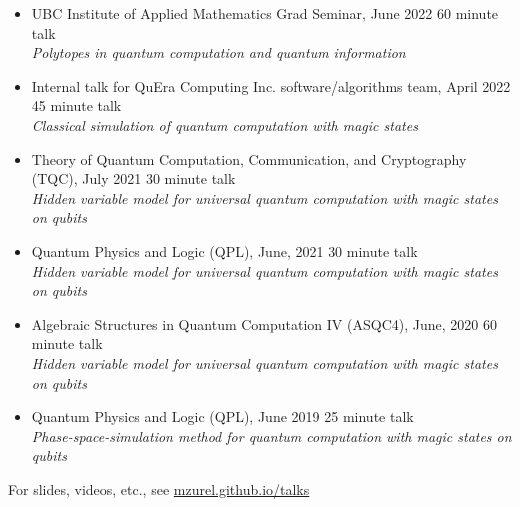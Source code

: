 \documentclass[letterpaper,11pt]{article}
\newcommand{\ConferenceItem}[3]{
	\item{\parbox{0.97\textwidth}{
		{#1}  \hfill {#2}\\
		\emph{#3}
	}}
}
\begin{document}
\begin{itemize}[leftmargin=*]
	\ConferenceItem{UBC Institute of Applied Mathematics Grad Seminar, June 2022}{60 minute talk}{Polytopes in quantum computation and quantum information}
	
	\ConferenceItem{Internal talk for QuEra Computing Inc. software/algorithms team, April 2022}{45 minute talk}{Classical simulation of quantum computation with magic states}
	
	\ConferenceItem{Theory of Quantum Computation, Communication, and Cryptography (TQC), July 2021}{30 minute talk}{Hidden variable model for universal quantum computation with magic states on qubits}
	
	\ConferenceItem{Quantum Physics and Logic (QPL), June, 2021}{30 minute talk}{Hidden variable model for universal quantum computation with magic states on qubits}
	
	\ConferenceItem{Algebraic Structures in Quantum Computation IV (ASQC4), June, 2020}{60 minute talk}{Hidden variable model for universal quantum computation with magic states on qubits}
	
	\ConferenceItem{Quantum Physics and Logic (QPL), June 2019}{25 minute talk}{Phase-space-simulation method for quantum computation with magic states on qubits}
\end{itemize}
For slides, videos, etc., see \href{https://mzurel.github.io/talks}{mzurel.github.io/talks}
\end{document}
